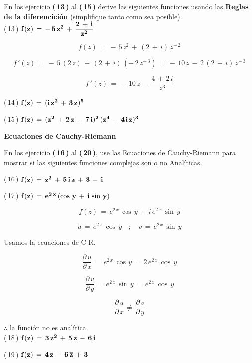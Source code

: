 \documentclass[a4paper,11pt,openany]{book}
\begin{document}
En los ejercicio \textbf{(\,13\,)} al \textbf{(\,15\,)} derive las siguientes funciones usando las \textbf{Reglas de la diferencición} (simplifique tanto como sea posible).\\

\textcolor{ao(english)}{(\,13\,)} $\bf{f(z)\,=\,-\,5\,z^{2}\,+\,\dfrac{2\,+\,i}{z^{2}}}$

$$f(z)\,=\,-\,5\,z^{2}\,+\,(2\,+\,i)\,z^{-\,2}$$

$$f\,'(z)\,=\,-\,5\,(2\,z)\,+\,(2\,+\,i)\,(-\,2\,z^{-\,3})\,=\,-\,10\,z\,-\,2\,(2\,+\,i)\,z^{-\,3}$$

$$f\,'(z)\,=\,-\,10\,z\,-\,\dfrac{4\,+\,2\,i}{z^{3}}$$

\textcolor{ao(english)}{(\,14\,)} $\bf{f(z)\,=\,(i\,z^{2}\,+\,3\,z)^{5}}$

\textcolor{ao(english)}{(\,15\,)} $\bf{f(z)\,=\,(z^{2}\,+\,2\,z\,-\,7\,i)^{2}\,(z^{4}\,-\,4\,i\,z)^{3}}$

\begin{center}
\textbf{Ecuaciones de Cauchy-Riemann}
\end{center}

En los ejercicio \textbf{(\,16\,)} al \textbf{(\,20\,)}, use las Ecuaciones de Cauchy-Riemann para mostrar si las siguientes funciones complejas son o no Analíticas.

\textcolor{ao(english)}{(\,16\,)} $\bf{f(z)\,=\,z^{2}\,+\,5\,i\,z\,+\,3\,-\,i}$

\textcolor{ao(english)}{(\,17\,)} $\bf{f(z)\,=\,e^{2\,x}\,(\cos\,y\,+\,i\,\sin\,y)}$

$$f(z)\,=\,e^{2\,x}\,\cos\,y\,+\,i\,e^{2\,x}\,\sin\,y$$

$$u\,=\,e^{2\,x}\,\cos\,y \quad;\quad v\,=\,e^{2\,x}\,\sin\,y$$

\textcolor{ao(english)}{} Usamos la ecuaciones de C-R.

$$\dfrac{\partial\,u}{\partial\,x}\,=\,e^{2\,x}\,\cos\,y\,=\,2\,e^{2\,x}\,\cos\,y$$

$$\dfrac{\partial\,v}{\partial\,y}\,=\,e^{2\,x}\,\sin\,y\,=\,e^{2\,x}\,\cos\,y$$

$$\dfrac{\partial\,u}{\partial\,x}\,\neq\,\dfrac{\partial\,v}{\partial\,y}$$

$\therefore$ la función no es analítica.\\

\textcolor{ao(english)}{(\,18\,)} $\bf{f(z)\,=\,3\,z^{2}\,+\,5\,z\,-\,6\,i}$

\textcolor{ao(english)}{(\,19\,)} $\bf{f(z)\,=\,4\,z\,-\,6\,\overline{z}\,+\,3}$
\end{document}
